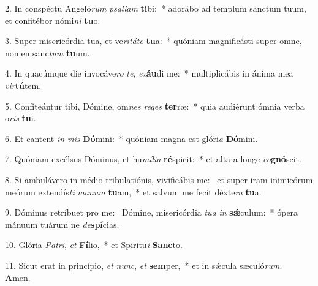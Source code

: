 2. In conspéctu Angeló\textit{rum} \textit{psal}\textit{lam} \textbf{ti}bi:~*  adorábo ad templum sanctum tuum, et confitébor nómi\textit{ni} \textbf{tu}o.\

3. Super misericórdia tua, et ve\textit{ri}\textit{tá}\textit{te} \textbf{tu}a:~*  quóniam magnificásti super omne, nomen sanc\textit{tum} \textbf{tu}um.\

4. In quacúmque die invocáve\textit{ro} \textit{te}, \textit{ex}\textbf{áu}di me:~*  multiplicábis in ánima mea \textit{vir}\textbf{tú}tem.\

5. Confiteántur tibi, Dómine, om\textit{nes} \textit{re}\textit{ges} \textbf{ter}ræ:~*  quia audiérunt ómnia verba o\textit{ris} \textbf{tu}i.\

6. Et cantent \textit{in} \textit{vi}\textit{is} \textbf{Dó}mini:~*  quóniam magna est glóri\textit{a} \textbf{Dó}mini.\

7. Quóniam excélsus Dóminus, et hu\textit{mí}\textit{li}\textit{a} \textbf{ré}spicit:~*  et alta a longe \textit{co}\textbf{gnó}scit.\

8. Si ambulávero in médio tribulatiónis, vivificábis me: \dag\  et super iram inimicórum meórum extendís\textit{ti} \textit{ma}\textit{num} \textbf{tu}am,~*  et salvum me fecit déxte\textit{ra} \textbf{tu}a.\

9. Dóminus retríbuet pro me: \dag\  Dómine, misericórdia \textit{tu}\textit{a} \textit{in} \textbf{sǽ}culum:~*  ópera mánuum tuárum ne \textit{de}\textbf{spí}cias.\

10. Glória \textit{Pa}\textit{tri}, \textit{et} \textbf{Fí}lio,~*  et Spirítu\textit{i} \textbf{Sanc}to.\

11. Sicut erat in princípio, \textit{et} \textit{nunc}, \textit{et} \textbf{sem}per,~*  et in sǽcula sæculó\textit{rum}. \textbf{A}men.\

